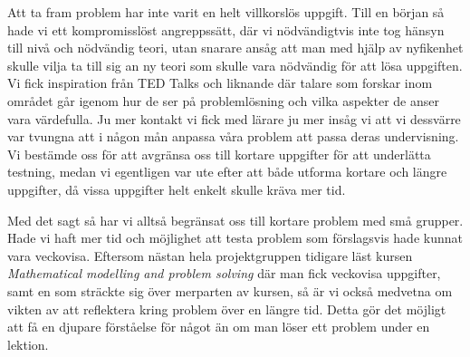 \textcolor{Mahogany}{Att ta fram problem har inte varit en helt villkorslös uppgift. Till en början så hade vi ett kompromisslöst angreppssätt, där vi nödvändigtvis inte tog hänsyn till nivå och nödvändig teori, utan snarare ansåg att man med hjälp av nyfikenhet skulle vilja ta till sig an ny teori som skulle vara nödvändig för att lösa uppgiften. Vi fick inspiration från TED Talks och liknande där talare som forskar inom området går igenom hur de ser på problemlösning och vilka aspekter de anser vara värdefulla. Ju mer kontakt vi fick med lärare ju mer insåg vi att vi dessvärre var tvungna att i någon mån anpassa våra problem att passa deras undervisning. Vi bestämde oss för att avgränsa oss till kortare uppgifter för att underlätta testning, medan vi egentligen var ute efter att både utforma kortare och längre uppgifter, då vissa uppgifter helt enkelt skulle kräva mer tid.}

\textcolor{Mahogany}{Med det sagt så har vi alltså begränsat oss till kortare problem med små grupper. Hade vi haft mer tid och möjlighet att testa problem som förslagsvis hade kunnat vara veckovisa. Eftersom nästan hela projektgruppen tidigare läst kursen \textsl{Mathematical modelling and problem solving}\cite{matmod} där man fick veckovisa uppgifter, samt en som sträckte sig över merparten av kursen, så är vi också medvetna om vikten av att reflektera kring problem över en längre tid. Detta gör det möjligt att få en djupare förståelse för något än om man löser ett problem under en lektion.}